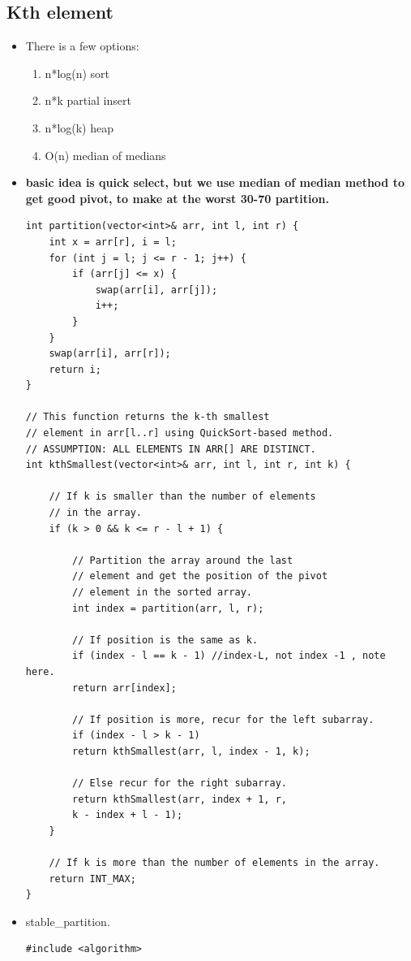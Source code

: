 \documentclass[a4paper,11pt,twoside]{book}
\begin{document}
\subsection{Kth element}
\begin{itemize}
	\item There is a few options:
	\begin{enumerate}
		\item n*log(n) sort
		\item n*k partial insert 
		\item n*log(k) heap 
		\item O(n) median of medians 
	\end{enumerate}

	\item \textbf{basic idea is quick select, but we use median of median method to get good pivot, to make at the worst 30-70 partition.}
	
\begin{lstlisting}
int partition(vector<int>& arr, int l, int r) {
	int x = arr[r], i = l;
	for (int j = l; j <= r - 1; j++) {
		if (arr[j] <= x) {
			swap(arr[i], arr[j]);
			i++;
		}
	}
	swap(arr[i], arr[r]);
	return i;
}

// This function returns the k-th smallest 
// element in arr[l..r] using QuickSort-based method.
// ASSUMPTION: ALL ELEMENTS IN ARR[] ARE DISTINCT.
int kthSmallest(vector<int>& arr, int l, int r, int k) {
	
	// If k is smaller than the number of elements
	// in the array.
	if (k > 0 && k <= r - l + 1) {
		
		// Partition the array around the last 
		// element and get the position of the pivot 
		// element in the sorted array.
		int index = partition(arr, l, r);
		
		// If position is the same as k.
		if (index - l == k - 1) //index-L, not index -1 , note here. 
		return arr[index];
		
		// If position is more, recur for the left subarray.
		if (index - l > k - 1) 
		return kthSmallest(arr, l, index - 1, k);
		
		// Else recur for the right subarray.
		return kthSmallest(arr, index + 1, r, 
		k - index + l - 1);
	}
	
	// If k is more than the number of elements in the array.
	return INT_MAX;
}
\end{lstlisting}
	
	\item stable\_partition.
\begin{lstlisting}
#include <algorithm>


\end{lstlisting}
\end{itemize}
\end{document}
